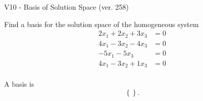 \begin{exercise}
  \begin{exerciseTitle}V10 - Basis of Solution Space (ver. 258)\end{exerciseTitle}
  \begin{exerciseStatement}
    Find a basis for the solution space of the homogeneous system 
\begin{align*}
 2 x_ 1 + 2 x_ 2 + 3 x_ 3 &= 0  \\ 
  4 x_ 1 -3 x_ 2 -4 x_ 3 &= 0  \\ 
  -5 x_ 1 -5 x_ 3 &= 0  \\ 
  4 x_ 1 -3 x_ 2 + 1 x_ 3 &= 0  \\ 
 \end{align*}


 
  \end{exerciseStatement}

  \begin{exerciseAnswer}
   A basis is   
\[\left\{\right\}.\]

  


  \end{exerciseAnswer}
\end{exercise}